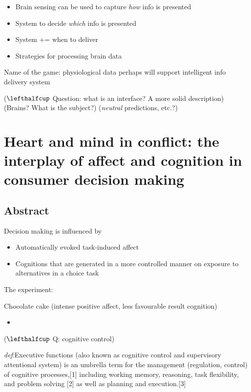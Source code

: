 \documentclass[11pt]{article}
\begin{document}
\begin{itemize}
\itemsep1pt\parskip0pt
\item
  Brain sensing can be used to capture \emph{how} info is presented
\item
  System to decide \emph{which} info is presented
\item
  System += when to deliver
\item
  Strategies for processing brain data
\end{itemize}

Name of the game: physiological data perhaps will support intelligent
info delivery system

($\lefthalfcup$ Question: what is an interface? A more solid description) (Brains? What
is the subject?) (\emph{neutral} predictions, etc.?)

\section{Heart and mind in conflict: the interplay of affect and
cognition in consumer decision
making}\label{heart-and-mind-in-conflict-the-interplay-of-affect-and-cognition-in-consumer-decision-making}

\subsection{Abstract}\label{abstract}

Decision making is influenced by

\begin{itemize}
\itemsep1pt\parskip0pt
\item
  Automatically evoked task-induced affect
\item
  Cognitions that are generated in a more controlled manner on exposure
  to alternatives in a choice task
\end{itemize}

The experiment:

Chocolate cake (intense positive affect, less favourable result
cognition)


\begin{itemize}
\itemsep1pt\parskip0pt
  \item 

\end{itemize}

($\lefthalfcup$ Q: cognitive control)

\emph{def}:Executive functions (also known as cognitive control and
supervisory attentional system) is an umbrella term for the management
(regulation, control) of cognitive processes,{[}1{]} including working
memory, reasoning, task flexibility, and problem solving {[}2{]} as well
as planning and execution.{[}3{]}
\end{document}
